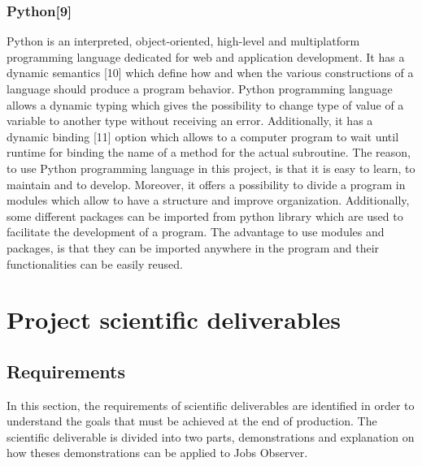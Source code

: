 \documentclass[conference,compsoc]{IEEEtran}
\begin{document}
\subsubsection{Python[9]}
Python is an interpreted, object-oriented, high-level and multiplatform programming language dedicated for web and application development. It has a dynamic semantics [10] which define how and when the various constructions of a language should produce a program behavior.         
\newline                                                                                                                                         
 Python programming language allows a dynamic typing which gives the possibility to change type of value of a variable to another type without receiving an error. Additionally, it has a dynamic binding [11] option which allows to a computer program to wait until runtime for binding the name of a method for the actual subroutine.      
\newline                                                                                                                                   
The reason, to use Python programming language in this project, is that it is easy to learn, to maintain and to develop. Moreover, it offers a possibility to divide a program in modules which allow to have a structure and improve organization. Additionally, some different packages can be imported from python library which are used to facilitate the development of a program. 
\newline
The advantage to use modules and packages, is that they can be imported anywhere in the program and their functionalities can be easily reused. 

\section{Project scientific deliverables}
\label{sec-production}
\subsection{Requirements}
In this section, the requirements of scientific deliverables are identified in order to understand the goals that must be achieved at the end of production. The scientific deliverable is divided into two parts, demonstrations and explanation on how theses demonstrations can be applied to Jobs Observer. 
\end{document}
